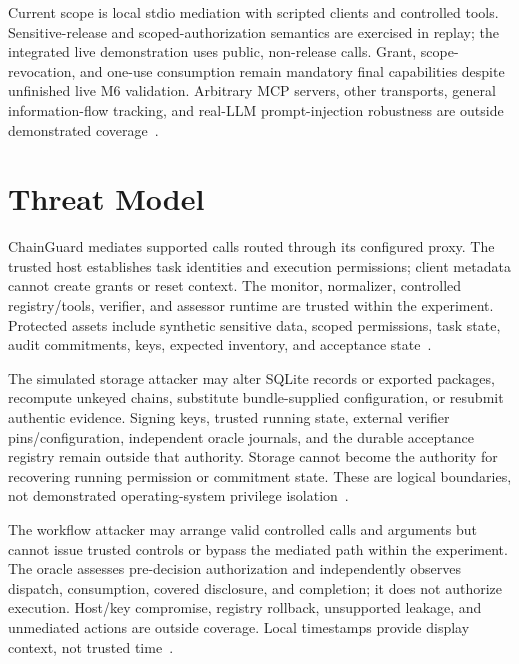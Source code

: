 \documentclass[conference]{IEEEtran}
\begin{document}
Current scope is local stdio mediation with scripted clients and controlled tools. Sensitive-release and scoped-authorization semantics are exercised in replay; the integrated live demonstration uses public, non-release calls. Grant, scope-revocation, and one-use consumption remain mandatory final capabilities despite unfinished live M6 validation. Arbitrary MCP servers, other transports, general information-flow tracking, and real-LLM prompt-injection robustness are outside demonstrated coverage~\cite{cglock,cgresults}.

\section{Threat Model}
ChainGuard mediates supported calls routed through its configured proxy. The trusted host establishes task identities and execution permissions; client metadata cannot create grants or reset context. The monitor, normalizer, controlled registry/tools, verifier, and assessor runtime are trusted within the experiment. Protected assets include synthetic sensitive data, scoped permissions, task state, audit commitments, keys, expected inventory, and acceptance state~\cite{cgthreat}.

The simulated storage attacker may alter SQLite records or exported packages, recompute unkeyed chains, substitute bundle-supplied configuration, or resubmit authentic evidence. Signing keys, trusted running state, external verifier pins/configuration, independent oracle journals, and the durable acceptance registry remain outside that authority. Storage cannot become the authority for recovering running permission or commitment state. These are logical boundaries, not demonstrated operating-system privilege isolation~\cite{cgthreat}.

The workflow attacker may arrange valid controlled calls and arguments but cannot issue trusted controls or bypass the mediated path within the experiment. The oracle assesses pre-decision authorization and independently observes dispatch, consumption, covered disclosure, and completion; it does not authorize execution. Host/key compromise, registry rollback, unsupported leakage, and unmediated actions are outside coverage. Local timestamps provide display context, not trusted time~\cite{cgthreat,cglock}.
\end{document}
